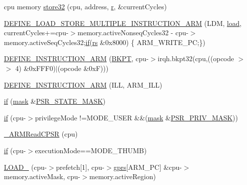 \begin{DoxyCompactItemize}
\item 
cpu memory \mbox{\hyperlink{isa-arm_8c_a2f2276eb553941abea041ba983b46e77}{store32}} (cpu, address, \mbox{\hyperlink{isa-arm_8c_ad0156306be8fa0a12414e0da384f986a}{r}}, \&current\+Cycles)
\item 
\mbox{\hyperlink{isa-arm_8c_a4a7fb780e97a1239869fd7d1f7d69821}{D\+E\+F\+I\+N\+E\+\_\+\+L\+O\+A\+D\+\_\+\+S\+T\+O\+R\+E\+\_\+\+M\+U\+L\+T\+I\+P\+L\+E\+\_\+\+I\+N\+S\+T\+R\+U\+C\+T\+I\+O\+N\+\_\+\+A\+RM}} (L\+DM, \mbox{\hyperlink{pufftest_8c_a6e4d4615cece3375ac8c7b94a1ade4fa}{load}}, current\+Cycles+=cpu-\/$>$memory.\+active\+Nonseq\+Cycles32 -\/ cpu-\/$>$memory.\+active\+Seq\+Cycles32;\mbox{\hyperlink{isa-lr35902_8c_a2eb27369cb3dbac14564f95cd51effdf}{if}}(\mbox{\hyperlink{isa-thumb_8c_a03b78d51ad860bbea2f9c98276d0b70b}{rs}} \&0x8000) \{ A\+R\+M\+\_\+\+W\+R\+I\+T\+E\+\_\+\+P\+C;\})
\item 
\mbox{\hyperlink{isa-arm_8c_a4b518939d81ac5c98b89b8d75b81a255}{D\+E\+F\+I\+N\+E\+\_\+\+I\+N\+S\+T\+R\+U\+C\+T\+I\+O\+N\+\_\+\+A\+RM}} (\mbox{\hyperlink{decoder-thumb_8c_ada39db97dab5656c737ecdd20e83feca}{B\+K\+PT}}, cpu-\/$>$irqh.\+bkpt32(cpu,((opcode $>$$>$ 4) \&0x\+F\+F\+F0)$\vert$(opcode \&0x\+F)))
\item 
\mbox{\hyperlink{isa-arm_8c_afb0f66ea2c143522a194346d86285dd4}{D\+E\+F\+I\+N\+E\+\_\+\+I\+N\+S\+T\+R\+U\+C\+T\+I\+O\+N\+\_\+\+A\+RM}} (I\+LL, A\+R\+M\+\_\+\+I\+LL)
\item 
\mbox{\hyperlink{isa-arm_8c_a0736bf8f9c6b829a423d7d7a43b781e8}{if}} (\mbox{\hyperlink{isa-arm_8c_a9fa3ab2bb634e0dde316d74d14fa564f}{mask}} \&\mbox{\hyperlink{isa-arm_8c_ae640bd0b96d0e7e17194658d36c3e441}{P\+S\+R\+\_\+\+S\+T\+A\+T\+E\+\_\+\+M\+A\+SK}})
\item 
\mbox{\hyperlink{isa-arm_8c_a9e03ac731cde2b545260afb666c2af44}{if}} (cpu-\/$>$privilege\+Mode !=M\+O\+D\+E\+\_\+\+U\+S\+ER \&\&(\mbox{\hyperlink{isa-arm_8c_a9fa3ab2bb634e0dde316d74d14fa564f}{mask}} \&\mbox{\hyperlink{isa-arm_8c_a808e705b60d550b9aa7f5111d431fc0c}{P\+S\+R\+\_\+\+P\+R\+I\+V\+\_\+\+M\+A\+SK}}))
\item 
\mbox{\hyperlink{isa-arm_8c_a1c3e7171981b2210085ead1b0ef20a29}{\+\_\+\+A\+R\+M\+Read\+C\+P\+SR}} (cpu)
\item 
\mbox{\hyperlink{isa-arm_8c_a2427b94b113c588ba9ead25c8cb63fbe}{if}} (cpu-\/$>$execution\+Mode==M\+O\+D\+E\+\_\+\+T\+H\+U\+MB)
\item 
\mbox{\hyperlink{isa-arm_8c_a88524ff7478b7ba92867d9b915c600e4}{L\+O\+A\+D\+\_}} (cpu-\/$>$prefetch\mbox{[}1\mbox{]}, cpu-\/$>$\mbox{\hyperlink{isa-thumb_8c_a6b4b7e13a9a144391615b217c5917bc7}{gprs}}\mbox{[}A\+R\+M\+\_\+\+PC\mbox{]} \&cpu-\/$>$memory.\+active\+Mask, cpu-\/$>$memory.\+active\+Region)
$$
\end{DoxyCompactItemize}

